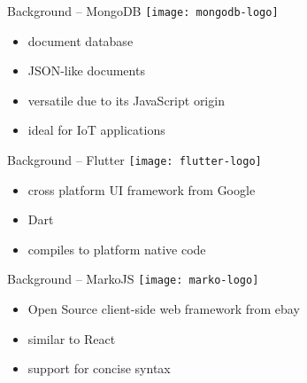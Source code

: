 \begin{frame}{Background -- MongoDB}
  \texttt{[image: mongodb-logo]}

  \vspace*{1.5em}

  \begin{itemize}
    \item document database
    \item JSON-like documents
    \item versatile due to its JavaScript origin
    \item ideal for IoT applications
  \end{itemize}
\end{frame}

\begin{frame}{Background -- Flutter}
  \texttt{[image: flutter-logo]}

  \vspace*{2em}

  \begin{itemize}
    \item cross platform UI framework from Google
    \item Dart
    \item compiles to platform native code
  \end{itemize}
\end{frame}

\begin{frame}{Background -- MarkoJS}
  \texttt{[image: marko-logo]}

  \vspace*{2em}

  \begin{itemize}
    \item Open Source client-side web framework from ebay
    \item similar to React
    \item support for concise syntax
  \end{itemize}
\end{frame}

